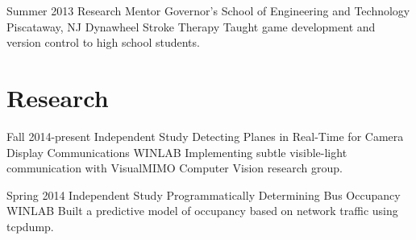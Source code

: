 \documentclass[11pt,letterpaper]{moderncv}
\begin{document}
    \cventry
        {Summer 2013}
        {Research Mentor}
        {Governor's School of Engineering and Technology}
        {Piscataway, NJ}
        {Dynawheel Stroke Therapy}
        {Taught game development and version control to high school students.}

\section{Research}
    \cventry
        {Fall 2014-present}
        {Independent Study}
        {Detecting Planes in Real-Time for Camera Display Communications}
        {}
        {WINLAB}
        {Implementing subtle visible-light communication with VisualMIMO Computer Vision research group.\\}

    \cventry
        {Spring 2014}
        {Independent Study}
        {Programmatically Determining Bus Occupancy}
        {}
        {WINLAB}
        {Built a predictive model of occupancy based on network traffic using tcpdump.\\}


\end{document}
